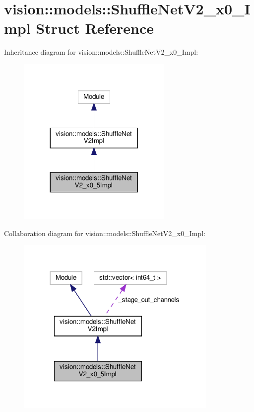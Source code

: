 \hypertarget{structvision_1_1models_1_1ShuffleNetV2__x0__5Impl}{}\section{vision\+:\+:models\+:\+:Shuffle\+Net\+V2\+\_\+x0\+\_\+Impl Struct Reference}
\label{structvision_1_1models_1_1ShuffleNetV2__x0__5Impl}


Inheritance diagram for vision\+:\+:models\+:\+:Shuffle\+Net\+V2\+\_\+x0\+\_\+Impl\+:
\nopagebreak
\begin{figure}[H]
\begin{center}
\leavevmode
\includegraphics[width=212pt]{structvision_1_1models_1_1ShuffleNetV2__x0__5Impl__inherit__graph}
\end{center}
\end{figure}


Collaboration diagram for vision\+:\+:models\+:\+:Shuffle\+Net\+V2\+\_\+x0\+\_\+Impl\+:
\nopagebreak
\begin{figure}[H]
\begin{center}
\leavevmode
\includegraphics[width=276pt]{structvision_1_1models_1_1ShuffleNetV2__x0__5Impl__coll__graph}
\end{center}
\end{figure}
